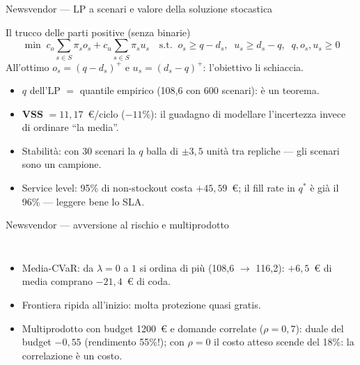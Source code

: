 \documentclass[11pt,aspectratio=169]{beamer}
\begin{document}
\begin{frame}{Newsvendor --- LP a scenari e valore della soluzione stocastica}
\begin{block}{Il trucco delle parti positive (senza binarie)}
\vspace{-2ex}
\[
\min\; c_o \sum_{s \in S} \pi_s o_s + c_u \sum_{s \in S} \pi_s u_s
\quad\text{s.t.}\;\; o_s \ge q - d_s,\;\; u_s \ge d_s - q,\;\; q, o_s, u_s \ge 0
\]
All'ottimo $o_s = (q - d_s)^+$ e $u_s = (d_s - q)^+$: l'obiettivo li schiaccia.
\end{block}
\begin{itemize}
  \item $q$ dell'LP $=$ quantile empirico (108,6 con 600 scenari): è un teorema.
  \item \textbf{VSS} $= 11{,}17$~\euro/ciclo ($-11\%$): il guadagno di modellare
        l'incertezza invece di ordinare ``la media''.
  \item Stabilità: con 30 scenari la $q$ balla di $\pm 3{,}5$ unità tra repliche ---
        gli scenari sono un campione.
  \item Service level: 95\% di non-stockout costa $+45{,}59$~\euro; il fill rate in
        $q^*$ è già il 96\% --- \alert{leggere bene lo SLA}.
\end{itemize}
\end{frame}

\begin{frame}{Newsvendor --- avversione al rischio e multiprodotto}
\begin{columns}
\small
\begin{itemize}
  \item Media-CVaR: da $\lambda = 0$ a $1$ si ordina di più (108,6 $\to$ 116,2):
        $+6{,}5$~\euro{} di media comprano $-21{,}4$~\euro{} di coda.
  \item Frontiera ripida all'inizio: molta protezione quasi gratis.
  \item Multiprodotto con budget 1200~\euro{} e domande correlate
        ($\rho = 0{,}7$): duale del budget $-0{,}55$ (rendimento 55\%!);
        con $\rho = 0$ il costo atteso scende del 18\%: la correlazione è un costo.
\end{itemize}
\end{columns}
\end{frame}
\end{document}
